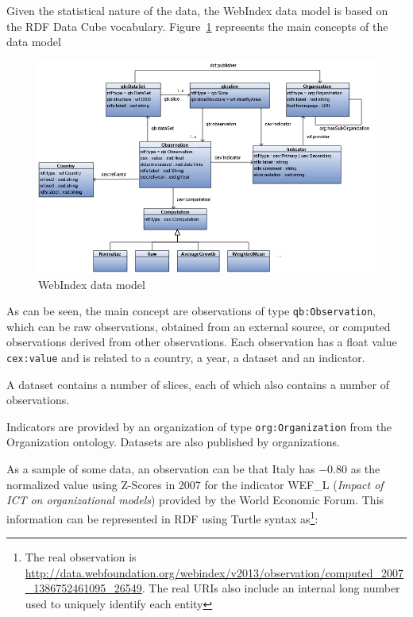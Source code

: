 \documentclass{llncs}
\begin{document}
Given the statistical nature of the data, the WebIndex data model is based on the RDF Data Cube vocabulary. Figure~\ref{Model} represents the main concepts of the data model

\begin{figure}[h]
\label{Model}
\begin{center}
\includegraphics[width=\textwidth]{Model}
\end{center}
\caption{WebIndex data model}
\end{figure}

As can be seen, the main concept are observations of type \lstinline|qb:Observation|, which 
can be raw observations,
obtained from an external source, 
or computed observations derived from other observations. 
Each observation has a float value \lstinline|cex:value| 
and is related to a country, a year, a dataset 
and an indicator.

A dataset contains a number of slices, each of which also contains a number of observations. 

Indicators are provided by an organization of type \lstinline|org:Organization| from the Organization ontology\cite{Organization14}. Datasets are also published by organizations. 

As a sample of some data, 
an observation can be that Italy has $-0.80$ as the normalized value using Z-Scores in 2007 for the indicator WEF\_L (\emph{Impact of ICT on organizational models}) provided by the World Economic Forum. 
This information can be represented in RDF using Turtle syntax as\footnote{The real observation is \url{http://data.webfoundation.org/webindex/v2013/observation/computed_2007_1386752461095_26549}. The real URIs also include an internal long number used to uniquely identify each entity}:
\end{document}

